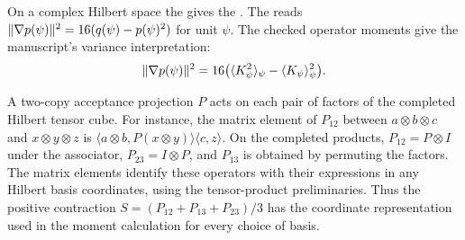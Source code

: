 \begin{lemma}\label{lem:gradient-identity}
  \leanok
  \par
  On a complex Hilbert space the 
  gives the .
  The  reads
  $\lVert \nabla p(\psi) \rVert^2=16(q(\psi)-p(\psi)^2)$ for unit $\psi$.
  The checked operator moments give the manuscript's variance interpretation:
  \[
    \lVert \nabla p(\psi) \rVert^2
      =16\bigl(\langle K_\psi^2\rangle_\psi-\langle K_\psi\rangle_\psi^2\bigr).
  \]
\end{lemma}

\begin{definition}\label{lem:three-copy-average}
  \leanok
  \par
  A two-copy acceptance projection $P$ acts on each pair of factors of the
  completed Hilbert tensor cube. For instance, the matrix element of $P_{12}$
  between $a\otimes b\otimes c$ and $x\otimes y\otimes z$ is
  $\langle a\otimes b,P(x\otimes y)\rangle\langle c,z\rangle$.
  On the completed products, $P_{12}=P\otimes I$ under the associator,
  $P_{23}=I\otimes P$, and $P_{13}$ is obtained by permuting the factors.
  The matrix elements identify these operators with their expressions in
  any Hilbert basis coordinates, using the tensor-product preliminaries.
  Thus the positive contraction
  $S=(P_{12}+P_{13}+P_{23})/3$ has the coordinate representation used in
  the moment calculation for every choice of basis.
\end{definition}

